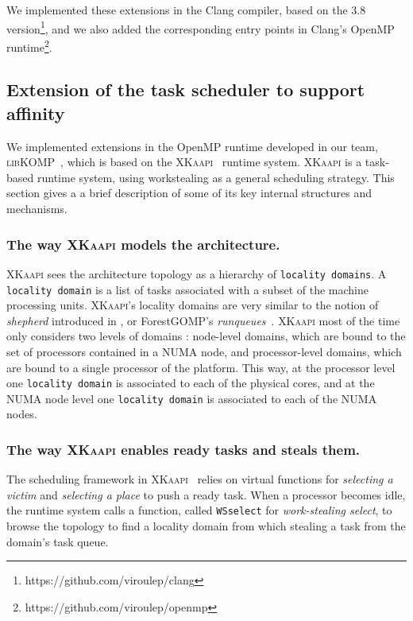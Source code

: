 \documentclass{Styles/llncs}
\newcommand{\kaapi}{\textsc{\mbox{XKaapi}}\xspace}
\newcommand{\libXKOMP}{\textsc{libKOMP}\xspace}
\begin{document}
We implemented these extensions in the Clang compiler, based on the 3.8 version\footnote{https://github.com/viroulep/clang}, and we also added the corresponding entry points in Clang's OpenMP runtime\footnote{https://github.com/viroulep/openmp}.


\subsection{Extension of the task scheduler to support affinity}

We implemented extensions in the OpenMP runtime developed in our team, \libXKOMP~\cite{Durand2013,libkomp},
which is based on the \kaapi~\cite{Bleuse2014,parco2015} runtime system.
\kaapi is a task-based runtime system, using workstealing as a general scheduling strategy.
This section gives a a brief description of some of its key internal structures and mechanisms.

\subsubsection{The way \kaapi models the architecture.}
\kaapi sees the architecture topology as a hierarchy of \verb/locality domains/.
A \verb/locality domain/ is a list of tasks associated with a subset of the machine processing units.
\kaapi's locality domains are very similar to the notion of \emph{shepherd} introduced in \cite{DBLP:journals/ijhpca/OlivierPWSP12}, or ForestGOMP's \emph{runqueues}~\cite{BroFurGogWacNam10IJPP}.
\kaapi most of the time only considers two levels of domains : node-level domains,
which are bound to the set of processors contained in a NUMA node, and processor-level domains, which are bound to a single processor of the platform.
This way, at the processor level one \verb/locality domain/ is associated to each of the physical cores, and
at the NUMA node level one \verb/locality domain/ is associated to each of the NUMA nodes.


\subsubsection{The way \kaapi enables ready tasks and steals them.}

The scheduling framework in \kaapi~\cite{Bleuse2014,parco2015} relies on virtual functions
for \textit{selecting a victim} and \textit{selecting a place} to push a ready task.
When a processor becomes idle, the runtime system calls a function, called  \verb/WSselect/ for \emph{work-stealing select}, to browse the topology to find a locality domain from which stealing a task from the domain's task queue.
\end{document}
